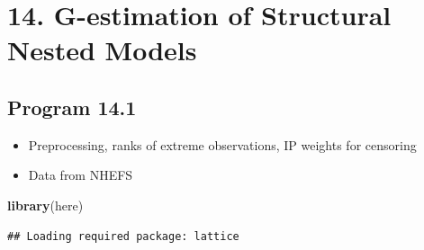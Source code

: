 \documentclass[
  10pt,
]{book}
\newenvironment{Shaded}{\begin{snugshade}}{\end{snugshade}}
\newcommand{\CommentTok}[1]{\textcolor[rgb]{0.56,0.35,0.01}{\textit{#1}}}
\newcommand{\DecValTok}[1]{\textcolor[rgb]{0.00,0.00,0.81}{#1}}
\newcommand{\KeywordTok}[1]{\textcolor[rgb]{0.13,0.29,0.53}{\textbf{#1}}}
\newcommand{\NormalTok}[1]{#1}
\newcommand{\OperatorTok}[1]{\textcolor[rgb]{0.81,0.36,0.00}{\textbf{#1}}}
\newcommand{\StringTok}[1]{\textcolor[rgb]{0.31,0.60,0.02}{#1}}
\providecommand{\tightlist}{%
  \setlength{\itemsep}{0pt}\setlength{\parskip}{0pt}}
\begin{document}
\hypertarget{g-estimation-of-structural-nested-models}{%
\chapter*{14. G-estimation of Structural Nested Models}\label{g-estimation-of-structural-nested-models}}

\hypertarget{program-14.1}{%
\section{Program 14.1}\label{program-14.1}}

\begin{itemize}
\tightlist
\item
  Preprocessing, ranks of extreme observations, IP weights for censoring
\item
  Data from NHEFS
\end{itemize}

\begin{Shaded}
\begin{Highlighting}[]
\KeywordTok{library}\NormalTok{(here)}
\end{Highlighting}
\end{Shaded}

\begin{Shaded}
\end{Shaded}

\begin{verbatim}
## Loading required package: lattice
\end{verbatim}
\end{document}
